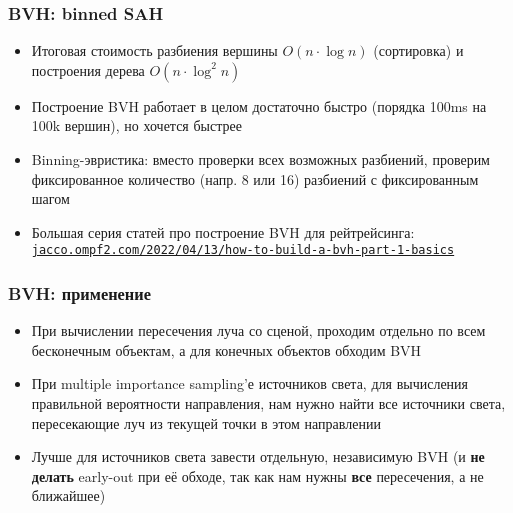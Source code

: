 \documentclass[handout,10pt]{beamer}
\begin{document}
\begin{frame}[fragile]
\frametitle{BVH: binned SAH}
\begin{itemize}
\item Итоговая стоимость разбиения вершины \begin{math}O(n\cdot \log n)\end{math} (сортировка) и построения дерева \begin{math}O(n\cdot \log^2 n)\end{math}
\pause
\item Построение BVH работает в целом достаточно быстро (порядка 100ms на 100k вершин), но хочется быстрее
\pause
\item Binning-эвристика: вместо проверки всех возможных разбиений, проверим фиксированное количество (напр. 8 или 16) разбиений с фиксированным шагом
\pause
\item Большая серия статей про построение BVH для рейтрейсинга: \href{https://jacco.ompf2.com/2022/04/13/how-to-build-a-bvh-part-1-basics/}{\texttt{jacco.ompf2.com/2022/04/13/how-to-build-a-bvh-part-1-basics}}
\end{itemize}
\end{frame}

\begin{frame}[fragile]
\frametitle{BVH: применение}
\begin{itemize}
\item При вычислении пересечения луча со сценой, проходим отдельно по всем бесконечным объектам, а для конечных объектов обходим BVH
\pause
\item При multiple importance sampling'е источников света, для вычисления правильной вероятности направления, нам нужно найти все источники света, пересекающие луч из текущей точки в этом направлении
\pause
\item Лучше для источников света завести отдельную, независимую BVH (и \textbf{не делать} early-out при её обходе, так как нам нужны \textbf{все} пересечения, а не ближайшее)
\end{itemize}
\end{frame}
\end{document}

